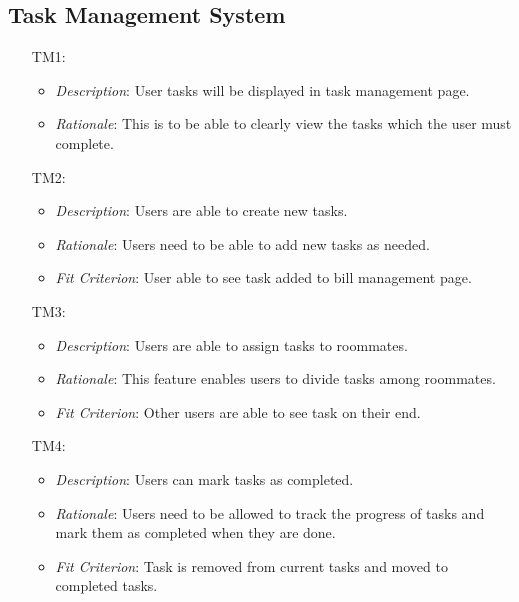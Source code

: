 \documentclass[12pt]{article}
\begin{document}
\subsection{Task Management System}
\noindent \begin{itemize}
    \item[TM1:] 
    \begin{itemize}
        \item \textit{Description}: User tasks will be displayed in task management page.
        \item \textit{Rationale}: This is to be able to clearly view the tasks which the user must complete.
    \end{itemize}
    \item[TM2:] 
    \begin{itemize}
    \item \textit{Description}: Users are able to create new tasks.
    \item \textit{Rationale}: Users need to be able to add new tasks as needed.
    \item \textit{Fit Criterion}: User able to see task added to bill management page.
    
    \end{itemize}
    \item[TM3:]
    \begin{itemize}
    \item \textit{Description}: Users are able to assign tasks to roommates.
    \item \textit{Rationale}: This feature enables users to divide tasks among roommates.
    \item \textit{Fit Criterion}: Other users are able to see task on their end.
    
    \end{itemize}
    \item[TM4:]
    \begin{itemize}
    \item \textit{Description}: Users can mark tasks as completed.
    \item \textit{Rationale}: Users need to be allowed to track the progress of tasks and mark them as completed when they are done.
    \item \textit{Fit Criterion}: Task is removed from current tasks and moved to completed tasks.
    \end{itemize}
    
\end{itemize}
\end{document}
